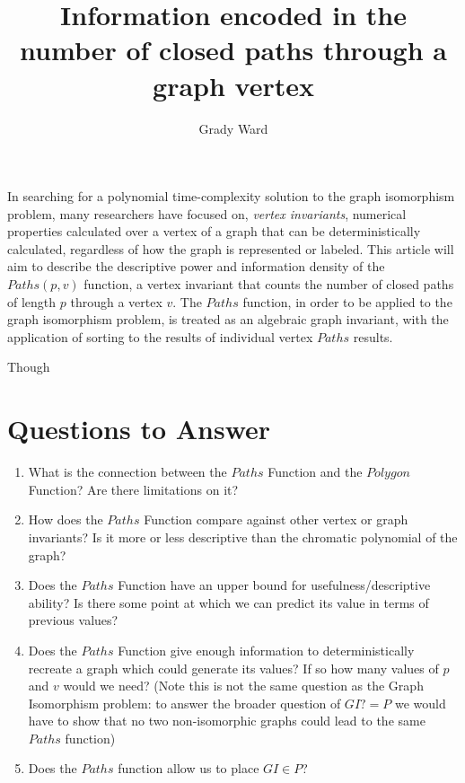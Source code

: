 \documentclass[a4paper,12pt]{article}
\begin{document}
\lstset{language=Python}

\title{Information encoded in the number of closed paths through a graph vertex}
\author{Grady Ward}

\maketitle



In searching for a polynomial time-complexity solution to the graph isomorphism problem, many researchers have focused on, \emph{vertex invariants}, numerical properties calculated over a vertex of a graph that can be deterministically calculated, regardless of how the graph is represented or labeled. This article will aim to describe the descriptive power and information density of the \(Paths(p, v)\) function, a vertex invariant that counts the number of closed paths of length \(p\) through a vertex \(v\). The \(Paths\) function, in order to be applied to the graph isomorphism problem, is treated as an algebraic graph invariant, with the application of sorting to the results of individual vertex \(Paths\) results.

Though



\section*{Questions to Answer}

\begin{enumerate}
    \item{What is the connection between the \(Paths\) Function and the \(Polygon\) Function?  Are there limitations on it?}
    \item{How does the \(Paths\) Function compare against other vertex or graph invariants?  Is it more or less descriptive than the chromatic polynomial of the graph?}
    \item{Does the \(Paths\) Function have an upper bound for usefulness/descriptive ability? Is there some point at which we can predict its value in terms of previous values?}
    \item{Does the \(Paths\) Function give enough information to deterministically recreate a graph which could generate its values? If so how many values of \(p\) and \(v\) would we need? (Note this is not the same question as the Graph Isomorphism problem: to answer the broader question of \(GI ?= P\) we would have to show that no two non-isomorphic graphs could lead to the same \(Paths\) function)}
    \item{Does the \(Paths\) function allow us to place \(GI \in P\)?}
\end{enumerate}
\end{document}
